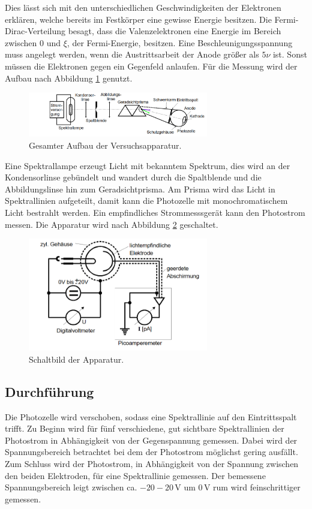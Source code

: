 Dies lässt sich mit den unterschiedlichen Geschwindigkeiten der Elektronen erklären, welche bereits im Festkörper
eine gewisse Energie besitzen. Die Fermi-Dirac-Verteilung besagt, dass die Valenzelektronen eine Energie im Bereich
zwischen $0$ und $\xi$, der Fermi-Energie, besitzen.
Eine Beschleunigungsspannung muss angelegt werden, wenn die Austrittsarbeit der Anode größer als $5\nu$ ist.
Sonst müssen die Elektronen gegen ein Gegenfeld anlaufen.
Für die Messung wird der Aufbau nach Abbildung \ref{fig:optisch} genutzt.
\begin{figure}
 \centering
 \includegraphics[width=0.7\textwidth]{aufbauganz.png}
 \caption{Gesamter Aufbau der Versuchsapparatur.\cite{sample}}
 \label{fig:optisch}
\end{figure}
Eine Spektrallampe erzeugt Licht mit bekanntem Spektrum, dies wird an der Kondensorlinse gebündelt und wandert durch
die Spaltblende und die Abbildungslinse hin zum Geradsichtprisma. Am Prisma wird das Licht in Spektrallinien aufgeteilt,
damit kann die Photozelle mit monochromatischem Licht bestrahlt werden. Ein empfindliches Strommesssgerät kann den Photostrom
messen. Die Apparatur wird nach Abbildung \ref{fig:schaltung} geschaltet.
\begin{figure}
 \centering
 \includegraphics[width=0.7\textwidth]{schaltung.png}
 \caption{Schaltbild der Apparatur.\cite{sample}}
 \label{fig:schaltung}
\end{figure}
\subsection{Durchführung}
Die Photozelle wird verschoben, sodass eine Spektrallinie auf den Eintrittsspalt trifft.
Zu Beginn wird für fünf verschiedene, gut sichtbare Spektrallinien der Photostrom in Abhängigkeit von der Gegenspannung gemessen.
Dabei wird der Spannungsbereich betrachtet bei dem der Photostrom möglichst gering ausfällt.
Zum Schluss wird der Photostrom, in Abhängigkeit von der Spannung zwischen den beiden Elektroden, für eine Spektrallinie gemessen.
Der bemessene Spannungsbereich leigt zwischen ca. $-20-20\,\si{\volt}$ um $0\,\si{\volt}$ rum wird feinschrittiger gemessen.
